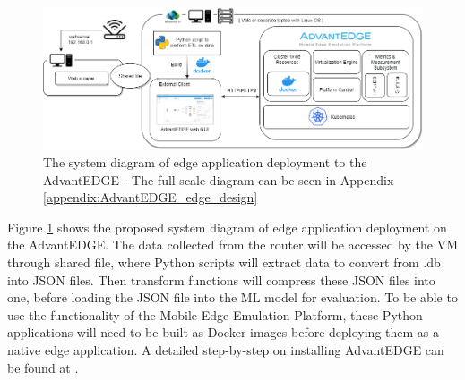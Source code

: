 \begin{figure}[ht]
    \centering
    \includegraphics[width=1\linewidth]{pages/Chapter3/Chapter 3 images/System Diagram.png}
    \caption{The system diagram of edge application deployment to the AdvantEDGE - The full scale diagram can be seen in Appendix \ref{appendix:AdvantEDGE_edge_design}}
    \label{fig:AdvantEDGE_edge_design}
\end{figure}

Figure \ref{fig:AdvantEDGE_edge_design} shows the proposed system diagram of edge application deployment on the AdvantEDGE. The data collected from the router will be accessed by the VM through shared file, where Python scripts will extract data to convert from .db into JSON files. Then transform functions will compress these JSON files into one, before loading the JSON file into the ML model for evaluation. To be able to use the functionality of the Mobile Edge Emulation Platform, these Python applications will need to be built as Docker images before deploying them as a native edge application. A detailed step-by-step on installing AdvantEDGE can be found at \cite{kevin_2020}.

